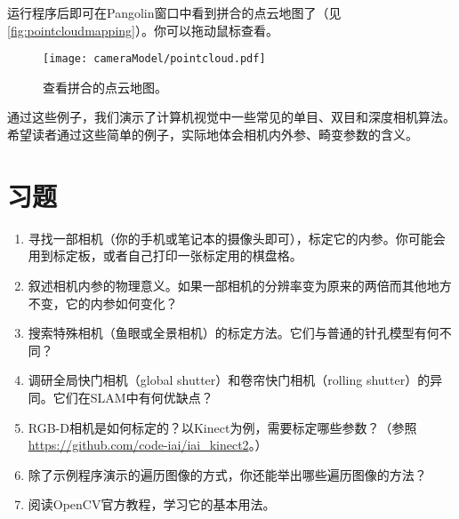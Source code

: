 运行程序后即可在Pangolin窗口中看到拼合的点云地图了（见\autoref{fig:pointcloudmapping}）。你可以拖动鼠标查看。

\begin{figure}[!htp]
	\centering
	\texttt{[image: cameraModel/pointcloud.pdf]}
	\caption{查看拼合的点云地图。}
	\label{fig:pointcloudmapping}
\end{figure}

通过这些例子，我们演示了计算机视觉中一些常见的单目、双目和深度相机算法。希望读者通过这些简单的例子，实际地体会相机内外参、畸变参数的含义。

\section*{习题}
\begin{enumerate}
	\item[\optional] 寻找一部相机（你的手机或笔记本的摄像头即可），标定它的内参。你可能会用到标定板，或者自己打印一张标定用的棋盘格。
	\item 叙述相机内参的物理意义。如果一部相机的分辨率变为原来的两倍而其他地方不变，它的内参如何变化？
	\item 搜索特殊相机（鱼眼或全景相机）的标定方法。它们与普通的针孔模型有何\mbox{不同？}
	\item 调研全局快门相机（global shutter）和卷帘快门相机（rolling shutter）的异同。它们在SLAM中有何优缺点？
	\item RGB-D相机是如何标定的？以Kinect为例，需要标定哪些参数？（参照\url{https://github.com/code-iai/iai_kinect2}。）
	\item 除了示例程序演示的遍历图像的方式，你还能举出哪些遍历图像的方法？
	\item[\optional] 阅读OpenCV官方教程，学习它的基本用法。
\end{enumerate}
